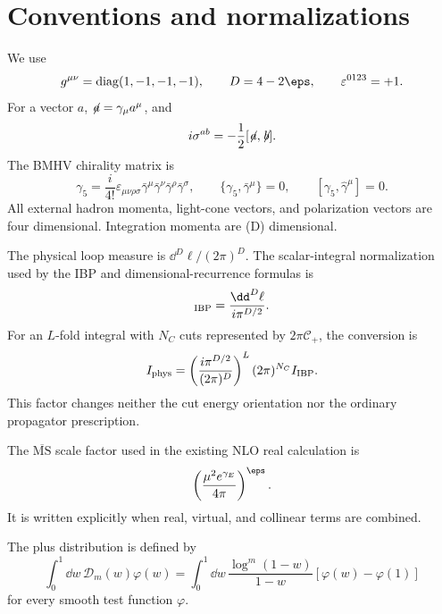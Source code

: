 \section{Conventions and normalizations}
\label{app:conventions}

We use
\begin{equation}
 g^{\mu\nu}=\operatorname{diag}(1,-1,-1,-1),
 \qquad D=4-2\eps,
 \qquad \varepsilon^{0123}=+1.
 \label{eq:metric-and-dimension}
\end{equation}
For a vector $a$, $\not\!a=\gamma_\mu a^\mu$, and
\begin{equation}
 i\sigma^{ab}=-\frac12[\not\!a,\not\!b].
 \label{eq:sigma-convention}
\end{equation}
The BMHV chirality matrix is
\begin{equation}
 \gamma_5=\frac{i}{4!}\varepsilon_{\mu\nu\rho\sigma}
 \bar\gamma^\mu\bar\gamma^\nu\bar\gamma^\rho\bar\gamma^\sigma,
 \qquad
 \{\gamma_5,\bar\gamma^\mu\}=0,
 \qquad
 [\gamma_5,\widehat\gamma^\mu]=0.
 \label{eq:bmhv-gamma5}
\end{equation}
All external hadron momenta, light-cone vectors, and polarization vectors are
four dimensional.  Integration momenta are (D) dimensional.

The physical loop measure is $\dd^D\ell/(2\pi)^D$.  The scalar-integral
normalization used by the IBP and dimensional-recurrence formulas is
\begin{equation}
 [\dd^D\ell]_{\rm IBP}=\frac{\dd^D\ell}{i\pi^{D/2}}.
 \label{eq:ibp-measure}
\end{equation}
For an $L$-fold integral with $N_C$ cuts represented by
$2\pi\mathcal C_+$, the conversion is
\begin{equation}
 I_{\rm phys}
 =\left(\frac{i\pi^{D/2}}{(2\pi)^D}\right)^L
 (2\pi)^{N_C}I_{\rm IBP}.
 \label{eq:ibp-physical-conversion}
\end{equation}
This factor changes neither the cut energy orientation nor the ordinary
propagator prescription.

The $\overline{\mathrm{MS}}$ scale factor used in the existing NLO real
calculation is
\begin{equation}
 \left(\frac{\mu^2e^{\gamma_E}}{4\pi}\right)^\eps.
 \label{eq:msbar-scale-factor}
\end{equation}
It is written explicitly when real, virtual, and collinear terms are combined.

The plus distribution is defined by
\begin{equation}
 \int_0^1\dd w\,\mathcal D_m(w)\varphi(w)
 =\int_0^1\dd w\,
 \frac{\log^m(1-w)}{1-w}[\varphi(w)-\varphi(1)]
 \label{eq:plus-test-function}
\end{equation}
for every smooth test function $\varphi$.

